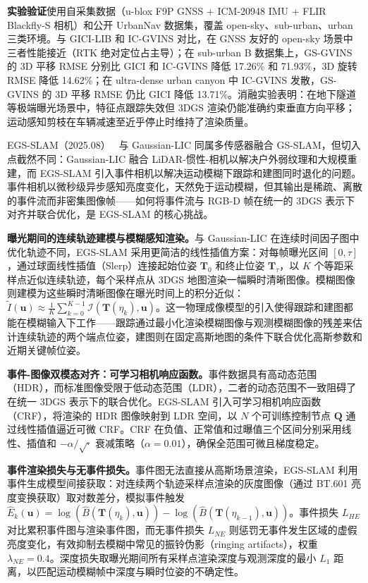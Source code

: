 \textbf{实验验证}使用自采集数据（u-blox F9P GNSS + ICM-20948 IMU + FLIR Blackfly-S 相机）和公开 UrbanNav 数据集，覆盖 open-sky、sub-urban、urban 三类环境。与 GICI-LIB 和 IC-GVINS 对比，在 GNSS 友好的 open-sky 场景中三者性能接近（RTK 绝对定位占主导）；在 sub-urban B 数据集上，GS-GVINS 的 3D 平移 RMSE 分别比 GICI 和 IC-GVINS 降低 17.26\% 和 71.93\%，3D 旋转 RMSE 降低 14.62\%；在 ultra-dense urban canyon 中 IC-GVINS 发散，GS-GVINS 的 3D 平移 RMSE 仍比 GICI 降低 13.71\%。消融实验表明：在地下隧道等极端曝光场景中，特征点跟踪失效但 3DGS 渲染仍能准确约束垂直方向平移；运动感知剪枝在车辆减速至近乎停止时维持了渲染质量。

EGS-SLAM（2025.08）~\cite{2508_07003} 与 Gaussian-LIC 同属多传感器融合 GS-SLAM，但切入点截然不同：Gaussian-LIC 融合 LiDAR-惯性-相机以解决户外弱纹理和大规模重建，而 EGS-SLAM 引入事件相机以解决运动模糊下跟踪和建图同时退化的问题。事件相机以微秒级异步感知亮度变化，天然免于运动模糊，但其输出是稀疏、离散的事件流而非密集图像帧——如何将事件流与 RGB-D 帧在统一的 3DGS 表示下对齐并联合优化，是 EGS-SLAM 的核心挑战。

\textbf{曝光期间的连续轨迹建模与模糊感知渲染。}与 Gaussian-LIC 在连续时间因子图中优化轨迹不同，EGS-SLAM 采用更简洁的线性插值方案：对每帧曝光区间 $[0, \tau]$，通过球面线性插值（Slerp）连接起始位姿 $\mathbf{T}_0$ 和终止位姿 $\mathbf{T}_\tau$，以 $K$ 个等距采样点近似连续轨迹，每个采样点从 3DGS 地图渲染一幅瞬时清晰图像。模糊图像则建模为这些瞬时清晰图像在曝光时间上的积分近似：$\tilde{I}(\bm{u}) \approx \frac{1}{K}\sum_{k=0}^{K-1} \mathcal{I}(\mathbf{T}(\eta_k), \bm{u})$。这一物理成像模型的引入使得跟踪和建图都能在模糊输入下工作——跟踪通过最小化渲染模糊图像与观测模糊图像的残差来估计连续轨迹的两个端点位姿，建图则在固定高斯地图的条件下联合优化高斯参数和近期关键帧位姿。

\textbf{事件-图像双模态对齐：可学习相机响应函数。}事件数据具有高动态范围（HDR），而标准图像受限于低动态范围（LDR），二者的动态范围不一致阻碍了在统一 3DGS 表示下的联合优化。EGS-SLAM 引入可学习相机响应函数（CRF），将渲染的 HDR 图像映射到 LDR 空间，以 $N$ 个可训练控制节点 $\bm{Q}$ 通过线性插值逼近可微 CRF。CRF 在负值、正常值和过曝值三个区间分别采用线性、插值和 $-\alpha/\sqrt{\cdot}$ 衰减策略（$\alpha=0.01$），确保全范围可微且梯度稳定。

\textbf{事件渲染损失与无事件损失。}事件图无法直接从高斯场景渲染，EGS-SLAM 利用事件生成模型间接获取：对连续两个轨迹采样点渲染的灰度图像（通过 BT.601 亮度变换获取）取对数差分，模拟事件触发 $\hat{E}_k(\bm{u}) = \log(\hat{B}(\mathbf{T}(\eta_k), \bm{u})) - \log(\hat{B}(\mathbf{T}(\eta_{k-1}), \bm{u}))$。事件损失 $L_{HE}$ 对比累积事件图与渲染事件图，而无事件损失 $L_{NE}$ 则惩罚无事件发生区域的虚假亮度变化，有效抑制去模糊中常见的振铃伪影（ringing artifacts），权重 $\lambda_{NE}=0.4$。深度损失取曝光期间所有采样点渲染深度与观测深度的最小 $L_1$ 距离，以匹配运动模糊帧中深度与瞬时位姿的不确定性。

